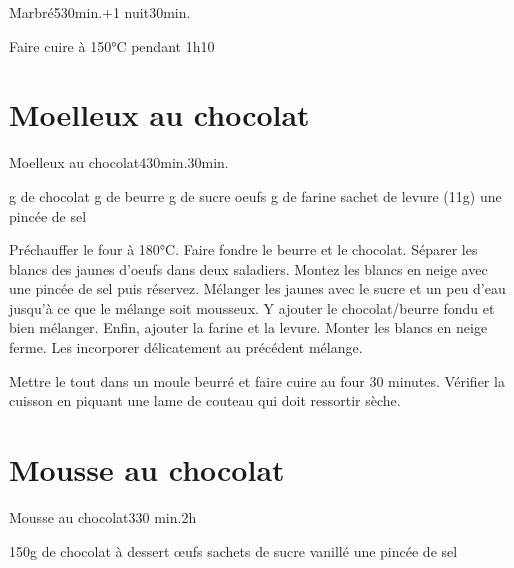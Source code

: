 {\begin{recette}{Marbré}{5}{30min.+1 nuit}{30min.}
\begin{cuisson}
Faire cuire à 150°C pendant 1h10

\end{cuisson}
\end{recette}

\section{Moelleux au chocolat}
\begin{recette}{Moelleux au chocolat}{4}{30min.}{30min.}
\begin{ingredients}
 g de chocolat
 g de beurre
 g de sucre
 oeufs
 g de farine
 sachet de levure (11g)
\ingredient une pincée de sel
\end{ingredients}

\begin{preparation}
\etape Préchauffer le four à 180°C.
\etape Faire fondre le beurre et le chocolat.
\etape Séparer les blancs des jaunes d'oeufs dans deux saladiers.
\etape Montez les blancs en neige avec une pincée de sel puis réservez. 
\etape Mélanger les jaunes avec le sucre et un peu d'eau jusqu'à ce que le mélange soit mousseux. 
\etape Y ajouter le chocolat/beurre fondu et bien mélanger. Enfin, ajouter la farine et la levure.
\etape Monter les blancs en neige ferme. Les incorporer délicatement au précédent mélange. 
\end{preparation}

\begin{cuisson}
Mettre le tout dans un moule beurré et faire cuire au four 30 minutes. Vérifier la cuisson en piquant une lame de couteau qui doit ressortir sèche. 
\end{cuisson}
\end{recette}

\section{Mousse au chocolat}
\begin{recette}{Mousse au chocolat}{3}{30 min.}{2h}
\begin{ingredients}[4 personnes]
\ingredient 150g de chocolat à dessert
 œufs
 sachets de sucre vanillé
\ingredient une pincée de sel
\end{ingredients}


\end{recette}}

